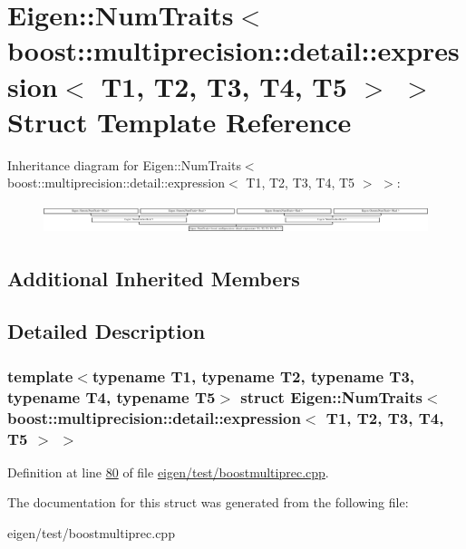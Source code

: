 \hypertarget{struct_eigen_1_1_num_traits_3_01boost_1_1multiprecision_1_1detail_1_1expression_3_01_t1_00_01_t2de536fef90a65f9e6892d34a2e1ed34d}{}\section{Eigen\+:\+:Num\+Traits$<$ boost\+:\+:multiprecision\+:\+:detail\+:\+:expression$<$ T1, T2, T3, T4, T5 $>$ $>$ Struct Template Reference}
\label{struct_eigen_1_1_num_traits_3_01boost_1_1multiprecision_1_1detail_1_1expression_3_01_t1_00_01_t2de536fef90a65f9e6892d34a2e1ed34d}
Inheritance diagram for Eigen\+:\+:Num\+Traits$<$ boost\+:\+:multiprecision\+:\+:detail\+:\+:expression$<$ T1, T2, T3, T4, T5 $>$ $>$\+:\begin{figure}[H]
\begin{center}
\leavevmode
\includegraphics[height=0.867769cm]{struct_eigen_1_1_num_traits_3_01boost_1_1multiprecision_1_1detail_1_1expression_3_01_t1_00_01_t2de536fef90a65f9e6892d34a2e1ed34d}
\end{center}
\end{figure}
\subsection*{Additional Inherited Members}


\subsection{Detailed Description}
\subsubsection*{template$<$typename T1, typename T2, typename T3, typename T4, typename T5$>$\newline
struct Eigen\+::\+Num\+Traits$<$ boost\+::multiprecision\+::detail\+::expression$<$ T1, T2, T3, T4, T5 $>$ $>$}



Definition at line \hyperlink{eigen_2test_2boostmultiprec_8cpp_source_l00080}{80} of file \hyperlink{eigen_2test_2boostmultiprec_8cpp_source}{eigen/test/boostmultiprec.\+cpp}.



The documentation for this struct was generated from the following file\+:\begin{DoxyCompactItemize}
\item 
eigen/test/boostmultiprec.\+cpp\end{DoxyCompactItemize}
